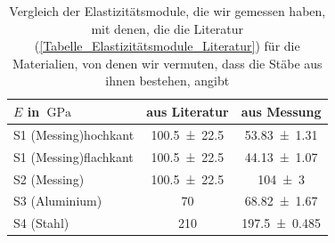 \documentclass[
	a4paper,
	12pt,
	pagesize,
	ngerman
]{scrartcl}
\begin{document}
	\begin{table}[tb]
		\centering
		\begin{tabular}{ l | c | c |}
			$E$ in $\SI{}{\giga \pascal}$& aus Literatur & aus Messung  \\ \hline
			S1 (Messing)hochkant & \SI{100,5\pm 22,5}{} & \SI{53,83\pm 1,31}{}\\
			S1 (Messing)flachkant& \SI{100,5\pm 22,5}{} & \SI{44,13\pm 1,07}{} \\ 
			S2 (Messing)&\SI{100,5\pm 22,5}{} &\SI{104\pm 3}{} \\
			S3 (Aluminium)&\SI{70}{}& \SI{68,82\pm 1,67}{} \\
			S4 (Stahl)&\SI{210}{} & \SI{197,5\pm 0,485}{} \\ \hline
		\end{tabular}
		\caption{Vergleich der Elastizitätsmodule, die wir gemessen haben, mit denen, die die Literatur (\cref{Tabelle_Elastizitätsmodule_Literatur}) für die Materialien, von denen wir vermuten, dass die Stäbe aus ihnen bestehen, angibt}
		\label{Vergleich_Elastizitätsmodule}
	\end{table}
	
\end{document}
